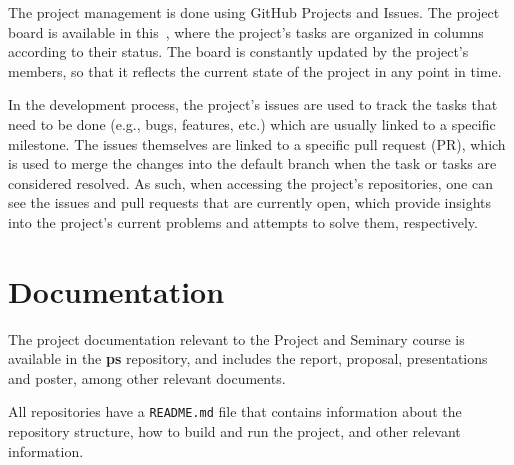 The project management is done using GitHub Projects and Issues.
The project board is available in this~,
where the project's tasks are organized in columns according to their status.
The board is constantly updated by the project's members, so that it reflects the current state of the project in any point in time.

In the development process,
the project's issues are used to track the tasks that need to be done
(e.g., bugs, features, etc.)
which are usually linked to a specific milestone.
The issues themselves are linked to a specific pull request (PR),
which is used to merge the changes into the default branch when the task or tasks are considered resolved.
As such, when accessing the project's repositories,
one can see the issues and pull requests that are currently open,
which provide insights into the project's current problems and attempts to solve them, respectively.


\section{Documentation}\label{sec:documentation}

The project documentation relevant to the Project and Seminary course is available in the \textbf{ps} repository,
and includes the report, proposal, presentations and poster, among other relevant documents.

All repositories have a \texttt{README.md} file that contains information about the repository structure, how to build and run the project, and other relevant information.
